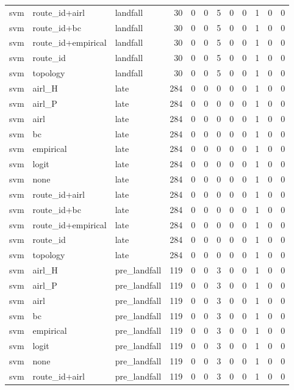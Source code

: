 \begin{tabular}{lllrrrrrrrrr}
svm & route_id+airl & landfall & 30 & 0 & 0 & 5 & 0 & 0 & 1 & 0 & 0 \\
svm & route_id+bc & landfall & 30 & 0 & 0 & 5 & 0 & 0 & 1 & 0 & 0 \\
svm & route_id+empirical & landfall & 30 & 0 & 0 & 5 & 0 & 0 & 1 & 0 & 0 \\
svm & route_id & landfall & 30 & 0 & 0 & 5 & 0 & 0 & 1 & 0 & 0 \\
svm & topology & landfall & 30 & 0 & 0 & 5 & 0 & 0 & 1 & 0 & 0 \\
svm & airl_H & late & 284 & 0 & 0 & 0 & 0 & 0 & 1 & 0 & 0 \\
svm & airl_P & late & 284 & 0 & 0 & 0 & 0 & 0 & 1 & 0 & 0 \\
svm & airl & late & 284 & 0 & 0 & 0 & 0 & 0 & 1 & 0 & 0 \\
svm & bc & late & 284 & 0 & 0 & 0 & 0 & 0 & 1 & 0 & 0 \\
svm & empirical & late & 284 & 0 & 0 & 0 & 0 & 0 & 1 & 0 & 0 \\
svm & logit & late & 284 & 0 & 0 & 0 & 0 & 0 & 1 & 0 & 0 \\
svm & none & late & 284 & 0 & 0 & 0 & 0 & 0 & 1 & 0 & 0 \\
svm & route_id+airl & late & 284 & 0 & 0 & 0 & 0 & 0 & 1 & 0 & 0 \\
svm & route_id+bc & late & 284 & 0 & 0 & 0 & 0 & 0 & 1 & 0 & 0 \\
svm & route_id+empirical & late & 284 & 0 & 0 & 0 & 0 & 0 & 1 & 0 & 0 \\
svm & route_id & late & 284 & 0 & 0 & 0 & 0 & 0 & 1 & 0 & 0 \\
svm & topology & late & 284 & 0 & 0 & 0 & 0 & 0 & 1 & 0 & 0 \\
svm & airl_H & pre_landfall & 119 & 0 & 0 & 3 & 0 & 0 & 1 & 0 & 0 \\
svm & airl_P & pre_landfall & 119 & 0 & 0 & 3 & 0 & 0 & 1 & 0 & 0 \\
svm & airl & pre_landfall & 119 & 0 & 0 & 3 & 0 & 0 & 1 & 0 & 0 \\
svm & bc & pre_landfall & 119 & 0 & 0 & 3 & 0 & 0 & 1 & 0 & 0 \\
svm & empirical & pre_landfall & 119 & 0 & 0 & 3 & 0 & 0 & 1 & 0 & 0 \\
svm & logit & pre_landfall & 119 & 0 & 0 & 3 & 0 & 0 & 1 & 0 & 0 \\
svm & none & pre_landfall & 119 & 0 & 0 & 3 & 0 & 0 & 1 & 0 & 0 \\
svm & route_id+airl & pre_landfall & 119 & 0 & 0 & 3 & 0 & 0 & 1 & 0 & 0 \\

\end{tabular}
